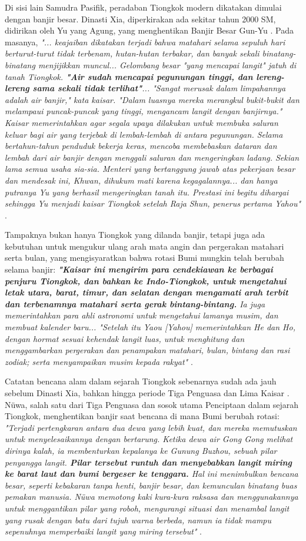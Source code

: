 \documentclass[10pt,twocolumn,letterpaper]{article}
\begin{document}
Di sisi lain Samudra Pasifik, peradaban Tiongkok modern dikatakan dimulai dengan banjir besar. Dinasti Xia, diperkirakan ada sekitar tahun 2000 SM, didirikan oleh Yu yang Agung, yang menghentikan Banjir Besar Gun-Yu \cite{6}. Pada masanya, \textit{"... keajaiban dikatakan terjadi bahwa matahari selama sepuluh hari berturut-turut tidak terbenam, hutan-hutan terbakar, dan banyak sekali binatang-binatang menjijikkan muncul... Gelombang besar "yang mencapai langit" jatuh di tanah Tiongkok. \textbf{"Air sudah mencapai pegunungan tinggi, dan lereng-lereng sama sekali tidak terlihat"}... "Sangat merusak dalam limpahannya adalah air banjir," kata kaisar. "Dalam luasnya mereka merangkul bukit-bukit dan melampaui puncak-puncak yang tinggi, mengancam langit dengan banjirnya." Kaisar memerintahkan agar segala upaya dilakukan untuk membuka saluran keluar bagi air yang terjebak di lembah-lembah di antara pegunungan. Selama bertahun-tahun penduduk bekerja keras, mencoba membebaskan dataran dan lembah dari air banjir dengan menggali saluran dan mengeringkan ladang. Sekian lama semua usaha sia-sia. Menteri yang bertanggung jawab atas pekerjaan besar dan mendesak ini, Khwan, dihukum mati karena kegagalannya... dan hanya putranya Yu yang berhasil mengeringkan tanah itu. Prestasi ini begitu dihargai sehingga Yu menjadi kaisar Tiongkok setelah Raja Shun, penerus pertama Yahou"} \cite{5}.

Tampaknya bukan hanya Tiongkok yang dilanda banjir, tetapi juga ada kebutuhan untuk mengukur ulang arah mata angin dan pergerakan matahari serta bulan, yang mengisyaratkan bahwa rotasi Bumi mungkin telah berubah selama banjir: \textit{\textbf{"Kaisar ini mengirim para cendekiawan ke berbagai penjuru Tiongkok, dan bahkan ke Indo-Tiongkok, untuk mengetahui letak utara, barat, timur, dan selatan dengan mengamati arah terbit dan terbenamnya matahari serta gerak bintang-bintang.} Ia juga memerintahkan para ahli astronomi untuk mengetahui lamanya musim, dan membuat kalender baru... "Setelah itu Yaou [Yahou] memerintahkan He dan Ho, dengan hormat sesuai kehendak langit luas, untuk menghitung dan menggambarkan pergerakan dan penampakan matahari, bulan, bintang dan rasi zodiak; serta menyampaikan musim kepada rakyat"} \cite{5}.

Catatan bencana alam dalam sejarah Tiongkok sebenarnya sudah ada jauh sebelum Dinasti Xia, bahkan hingga periode Tiga Penguasa dan Lima Kaisar \cite{7}. Nüwa, salah satu dari Tiga Penguasa dan sosok utama Penciptaan dalam sejarah Tiongkok, menghentikan banjir saat bencana di mana Bumi berubah rotasi: \textit{"Terjadi pertengkaran antara dua dewa yang lebih kuat, dan mereka memutuskan untuk menyelesaikannya dengan bertarung. Ketika dewa air Gong Gong melihat dirinya kalah, ia membenturkan kepalanya ke Gunung Buzhou, sebuah pilar penyangga langit. \textbf{Pilar tersebut runtuh dan menyebabkan langit miring ke barat laut dan bumi bergeser ke tenggara.} Hal ini menimbulkan bencana besar, seperti kebakaran tanpa henti, banjir besar, dan kemunculan binatang buas pemakan manusia. Nüwa memotong kaki kura-kura raksasa dan menggunakannya untuk menggantikan pilar yang roboh, mengurangi situasi dan menambal langit yang rusak dengan batu dari tujuh warna berbeda, namun ia tidak mampu sepenuhnya memperbaiki langit yang miring tersebut"} \cite{8}.
\end{document}
